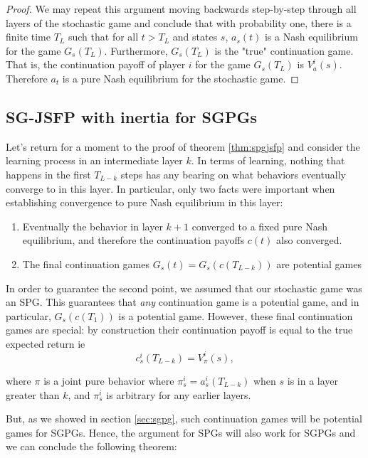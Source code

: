 \begin{proof}
We may repeat this argument moving backwards step-by-step through all layers of the stochastic game and conclude that with probability one, there is a finite time $T_L$ such that for all $t > T_L$ and states $s$, $a_s(t)$ is a Nash equilibrium for the game $G_s(T_L)$. Furthermore, $G_s(T_L)$ is the "true" continuation game. That is, the continuation payoff of player $i$ for the game $G_s(T_L)$ is $V^i_{a}(s)$. Therefore $a_t$ is a pure Nash equilibrium for the stochastic game.



\end{proof}


\subsection{SG-JSFP with inertia for SGPGs}

Let's return for a moment to the proof of theorem \ref{thm:spgjsfp} and consider the learning process in an intermediate layer $k$. In terms of learning, nothing that happens in the first $T_{L-k}$ steps has any bearing on what behaviors eventually converge to in this layer. In particular, only two facts were important when establishing convergence to pure Nash equilibrium in this layer:

\begin{enumerate}
\item Eventually the behavior in layer $k+1$ converged to a fixed pure Nash equilibrium, and therefore the continuation payoffs $c(t)$ also converged.

\item The final continuation games $G_s(t) = G_s(c(T_{L-k}))$ are potential games
\end{enumerate}


In order to guarantee the second point, we assumed that our stochastic game was an SPG. This guarantees that {\em any} continuation game is a potential game, and in particular, $G_s(c(T_1))$ is a potential game. However, these final continuation games are special: by construction their continuation payoff is equal to the true expected return ie
$$
c^i_s(T_{L-k}) = V^i_{\pi}(s),
$$

\noindent where $\pi$ is a joint pure behavior where $\pi^i_s = a^i_s(T_{L-k})$ when $s$ is in a layer greater than $k$, and $\pi^i_s$ is arbitrary for any earlier layers. 

But, as we showed in section \ref{sec:sgpg}, such continuation games will be potential games for SGPGs. Hence, the argument for SPGs will also work for SGPGs and we can conclude the following theorem:

